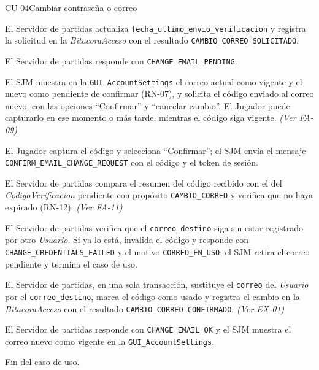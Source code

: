 \begin{fichacu}{CU-04}{Cambiar contraseña o correo}
{\begin{cuenum}[start=1]
      \item El Servidor de partidas actualiza \texttt{fecha\_\allowbreak{}ultimo\_\allowbreak{}envio\_\allowbreak{}verificacion} y registra la solicitud en la \textit{BitacoraAcceso} con el resultado \texttt{CAMBIO\_\allowbreak{}CORREO\_\allowbreak{}SOLICITADO}.
      \item El Servidor de partidas responde con \texttt{CHANGE\_\allowbreak{}EMAIL\_\allowbreak{}PENDING}.
      \item El SJM muestra en la \texttt{GUI\_\allowbreak{}AccountSettings} el correo actual como vigente y el nuevo como pendiente de confirmar (\mbox{RN-07}), y solicita el código enviado al correo nuevo, con las opciones ``Confirmar'' y ``cancelar cambio''. El Jugador puede capturarlo en ese momento o más tarde, mientras el código siga vigente. \textit{(Ver \mbox{FA-09})}
      \item El Jugador captura el código y selecciona ``Confirmar''; el SJM envía el mensaje \texttt{CONFIRM\_\allowbreak{}EMAIL\_\allowbreak{}CHANGE\_\allowbreak{}REQUEST} con el código y el token de sesión.
      \item El Servidor de partidas compara el resumen del código recibido con el del \textit{CodigoVerificacion} pendiente con propósito \texttt{CAMBIO\_\allowbreak{}CORREO} y verifica que no haya expirado (\mbox{RN-12}). \textit{(Ver \mbox{FA-11})}
      \item El Servidor de partidas verifica que el \texttt{correo\_\allowbreak{}destino} siga sin estar registrado por otro \textit{Usuario}. Si ya lo está, invalida el código y responde con \texttt{CHANGE\_\allowbreak{}CREDENTIALS\_\allowbreak{}FAILED} y el motivo \texttt{CORREO\_\allowbreak{}EN\_\allowbreak{}USO}; el SJM retira el correo pendiente y termina el caso de uso.
      \item El Servidor de partidas, en una sola transacción, sustituye el \texttt{correo} del \textit{Usuario} por el \texttt{correo\_\allowbreak{}destino}, marca el código como usado y registra el cambio en la \textit{BitacoraAcceso} con el resultado \texttt{CAMBIO\_\allowbreak{}CORREO\_\allowbreak{}CONFIRMADO}. \textit{(Ver \mbox{EX-01})}
      \item El Servidor de partidas responde con \texttt{CHANGE\_\allowbreak{}EMAIL\_\allowbreak{}OK} y el SJM muestra el correo nuevo como vigente en la \texttt{GUI\_\allowbreak{}AccountSettings}.
      \item Fin del caso de uso.
    \end{cuenum}} \\

\end{fichacu}

